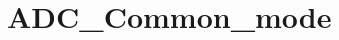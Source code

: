 \hypertarget{group___a_d_c___common__mode}{\section{A\-D\-C\-\_\-\-Common\-\_\-mode}
\label{group___a_d_c___common__mode}
}
